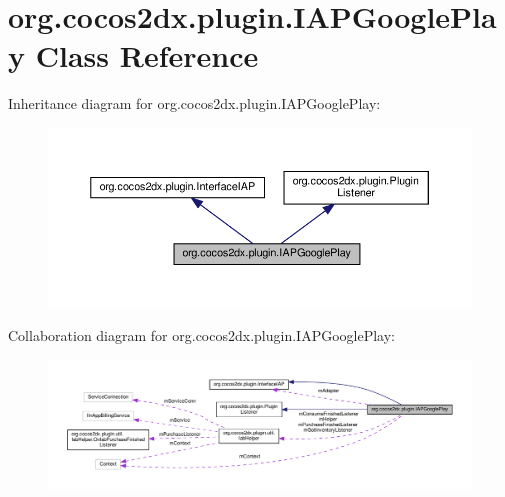 \hypertarget{classorg_1_1cocos2dx_1_1plugin_1_1IAPGooglePlay}{}\section{org.\+cocos2dx.\+plugin.\+I\+A\+P\+Google\+Play Class Reference}
\label{classorg_1_1cocos2dx_1_1plugin_1_1IAPGooglePlay}


Inheritance diagram for org.\+cocos2dx.\+plugin.\+I\+A\+P\+Google\+Play\+:
\nopagebreak
\begin{figure}[H]
\begin{center}
\leavevmode
\includegraphics[width=350pt]{classorg_1_1cocos2dx_1_1plugin_1_1IAPGooglePlay__inherit__graph}
\end{center}
\end{figure}


Collaboration diagram for org.\+cocos2dx.\+plugin.\+I\+A\+P\+Google\+Play\+:
\nopagebreak
\begin{figure}[H]
\begin{center}
\leavevmode
\includegraphics[width=350pt]{classorg_1_1cocos2dx_1_1plugin_1_1IAPGooglePlay__coll__graph}
\end{center}
\end{figure}

